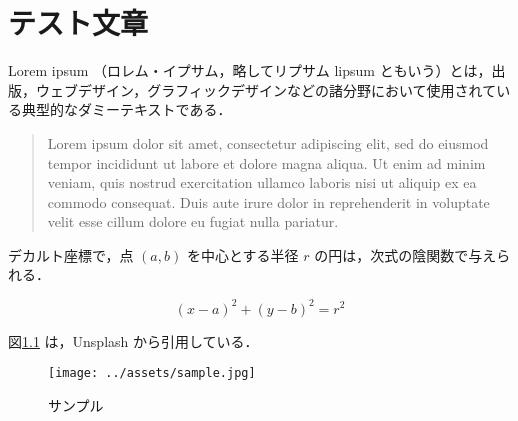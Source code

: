 \chapter{テスト文章}\label{sec:first}

Lorem ipsum \cite{LoremipsWikipedia:online} （ロレム・イプサム，略してリプサム lipsum ともいう）とは，出版，ウェブデザイン，グラフィックデザインなどの諸分野において使用されている典型的なダミーテキストである．

\begin{quote}
  Lorem ipsum dolor sit amet, consectetur adipiscing elit, sed do eiusmod tempor incididunt ut labore et dolore magna aliqua. Ut enim ad minim veniam, quis nostrud exercitation ullamco laboris nisi ut aliquip ex ea commodo consequat. Duis aute irure dolor in reprehenderit in voluptate velit esse cillum dolore eu fugiat nulla pariatur.
\end{quote}

デカルト座標で，点 \((a, b)\) を中心とする半径 \(r\) の円は，次式の陰関数で与えられる．

\[
(x - a)^2 + (y - b)^2 = r^2
\label{eq:circle}
\]

図\ref{fig:image} は，Unsplash \footnotemark から引用している．


\begin{figure}[tb]
\centering
\texttt{[image: ../assets/sample.jpg]}
\caption{サンプル}
\label{fig:image}
\end{figure}
